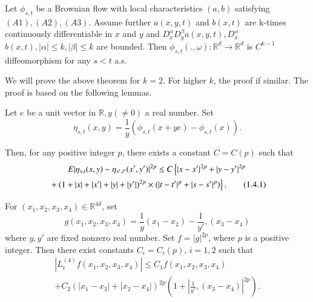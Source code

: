 \begin{theorem}\label{c1:thm1.4.1}%
  Let $\phi_{s,t}$ be a Brownian flow with local characteristics
  $(a,b)$ satisfying $(A1),(A2),(A3)$. Assume further $a (x,y,t)$ and
  $b(x,t)$ are k-times continuously differentiable in $x$ and $y$ and
  $D^\alpha_x D^\beta_y a (x,y,t),  D^\alpha_x$ $b (x,t), |\alpha| \le
  k, |\beta| \le k$ are bounded. Then $\phi_{s,t}(.,\omega):
  \mathbb{R}^d \to \mathbb{R}^d$ is $C^{k-1}$ diffeomorphism for any
  $s < t$ a.s.  
\end{theorem}

We will prove the above theorem for $k=2$. For higher $k$, the proof
if similar. The proof is based on the following lemmas. 

\setcounter{Lemma}{1}
\begin{Lemma}\label{c1:lem1.4.2}%
  Let $e$ be a unit vector in $\mathbb{R}, y (\neq 0)$ a real number. Set
  $$
  \eta _{s,t}{{(x,y)}} = \frac{1}{y} (\phi_{s,t} (x+ye) -\phi_{s,t}{{(x)}}).
  $$ 
\end{Lemma}

Then, for any positive integer $p$, there exists a constant $C = C
(p)$ such that 
\begin{multline*}
  E|\eta_{s,t}{{(x,y)}} -\eta_{s',t'}{{(x',y')}}|^{2p} \le C
  \left\{|x-x'|^{2p} + |y-y'|^{2p}\right.\\ 
  \left. \vphantom{|^{2p}} + (1+|x|+|x'|+|y|+|y'|)^{2p} \times
  (|t-t'|^p+|s-s'|^p)\right\}. \tag{1.4.1}\label{c1:eq1.4.1} 
\end{multline*}

\begin{Lemma}\label{c1:lem1.4.3}\pageoriginale%
  For $(x_1,x_2,x_3,x_4) \in \mathbb{R}^{4d}$, set 
  $$
  g (x_1, x_2,x_3,x_4)= \frac{1}{y}(x_1 - x_2) - \frac{1}{y'}, (x_3 -x_4)
  $$
  where $y,y'$ are fixed nonzero real number. Set $f = |g|^{2p}$,
  where $p$ is a positive integer. Then there exist constants $C_i =
  C_i(p), \, i = 1,2$ such that 
  \begin{multline*}
    |L^{(4)}_t f(x_1,x_2,x_3,x_4)| \le C_1 f(x_1,x_2,x_3,x_4)\\
    + C_2(|x_1-x_3|+|x_2-x_4|)^{2p} \left(1+|\frac{1}{y'},
    (x_3-x_4)|^{2p}\right). \tag{1.4.2}\label{c1:eq1.4.2} 
  \end{multline*}
\end{Lemma}

